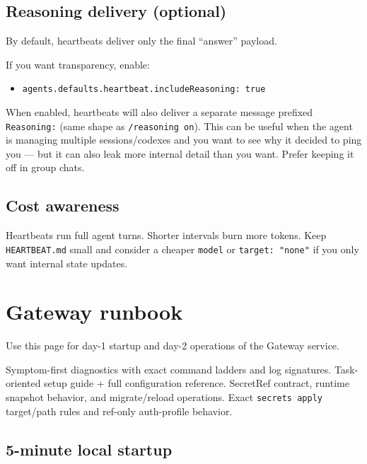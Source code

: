 \subsection{Reasoning delivery (optional)}


By default, heartbeats deliver only the final “answer” payload.

If you want transparency, enable:

\begin{itemize}
  \item \texttt{agents.defaults.heartbeat.includeReasoning: true}
\end{itemize}


When enabled, heartbeats will also deliver a separate message prefixed
\texttt{Reasoning:} (same shape as \texttt{/reasoning on}). This can be useful when the agent
is managing multiple sessions/codexes and you want to see why it decided to ping
you — but it can also leak more internal detail than you want. Prefer keeping it
off in group chats.

\subsection{Cost awareness}


Heartbeats run full agent turns. Shorter intervals burn more tokens. Keep
\texttt{HEARTBEAT.md} small and consider a cheaper \texttt{model} or \texttt{target: "none"} if you
only want internal state updates.


\clearpage

\section{Gateway runbook}


Use this page for day-1 startup and day-2 operations of the Gateway service.

Symptom-first diagnostics with exact command ladders and log signatures.
Task-oriented setup guide + full configuration reference.
SecretRef contract, runtime snapshot behavior, and migrate/reload operations.
Exact \texttt{secrets apply} target/path rules and ref-only auth-profile behavior.

\subsection{5-minute local startup}



